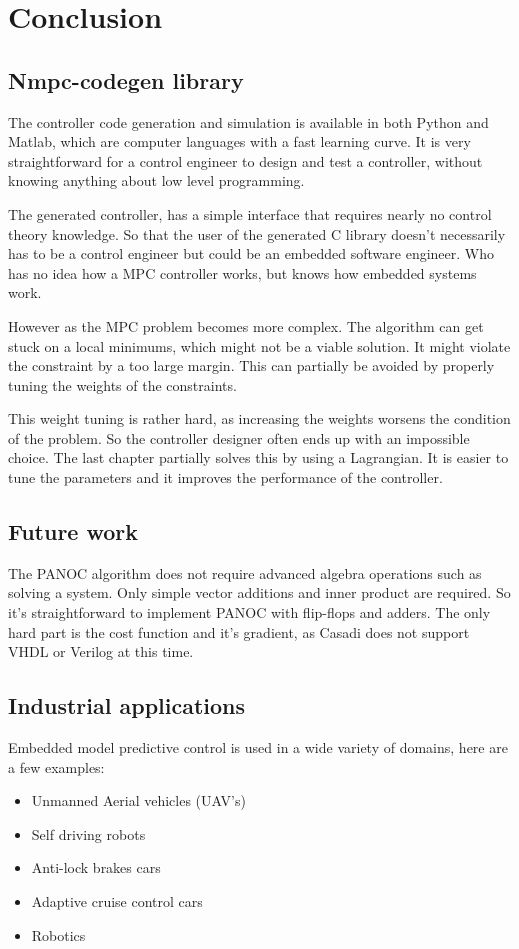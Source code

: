 \chapter{Conclusion}
\label{cha:conclusion}

\section{Nmpc-codegen library}
The controller code generation and simulation is available in both Python and Matlab, which are computer languages with a fast learning curve. It is very straightforward for a control engineer to design and test a controller, without knowing anything about low level programming.

The generated controller, has a simple interface that requires nearly no control theory knowledge. So that the user of the generated C library doesn't necessarily has to be a control engineer but could be an embedded software engineer. Who has no idea how a MPC controller works, but knows how embedded systems work.

However as the MPC problem becomes more complex. The algorithm can get stuck on a local minimums, which might not be a viable solution. It might violate the constraint by a too large margin. This can partially be avoided by properly tuning the weights of the constraints. 

This weight tuning is rather hard, as increasing the weights worsens the condition of the problem. So the controller designer often ends up with an impossible choice. The last chapter partially solves this by using a Lagrangian. It is easier to tune the parameters and it improves the performance of the controller. 

\section{Future work}
The PANOC algorithm does not require advanced algebra operations such as solving a system. Only simple vector additions and inner product are required. So it's straightforward to implement PANOC with flip-flops and adders. The only hard part is the cost function and it's gradient, as Casadi does not support VHDL or Verilog at this time.

\clearpage

\section{Industrial applications}
Embedded model predictive control is used in a wide variety of domains, here are a few examples:
\begin{itemize}
	\item Unmanned Aerial vehicles (UAV's)
	\item Self driving robots
	\item Anti-lock brakes cars
	\item Adaptive cruise control cars
	\item Robotics
\end{itemize}

